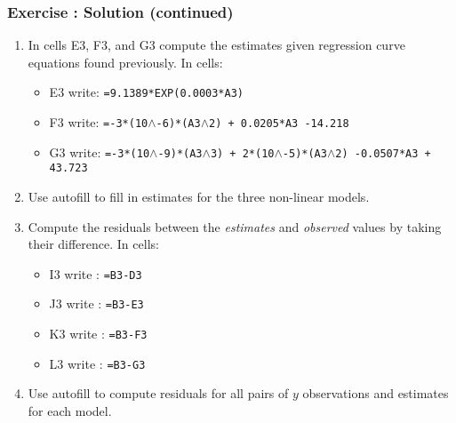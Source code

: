 \documentclass[12pt]{beamer}
\begin{document}
	\begin{frame}
		\frametitle{Exercise : Solution (continued)}
		\begin{enumerate}
			\item In cells E3, F3, and G3 compute the estimates given regression curve equations found previously. In cells:
			\begin{itemize}
				\item E3 write: \texttt{=9.1389*EXP(0.0003*A3)}
				\item F3 write: \texttt{=-3*(10$\wedge$-6)*(A3$\wedge$2) + 0.0205*A3 -14.218}
				\item G3 write: \texttt{=-3*(10$\wedge$-9)*(A3$\wedge$3) + 2*(10$\wedge$-5)*(A3$\wedge$2) -0.0507*A3 + 43.723}
			\end{itemize}
		\item Use autofill to fill in estimates for the three non-linear models. 
		\item Compute the residuals between the \textit{estimates} and \textit{observed} values by taking their difference. In cells:
		\begin{itemize}
			\item I3 write : \texttt{=B3-D3}
			\item J3 write : \texttt{=B3-E3}
			\item K3 write : \texttt{=B3-F3}
			\item L3 write : \texttt{=B3-G3}
		\end{itemize}
		\item Use autofill to compute residuals for all pairs of $y$ observations and estimates for each model.
	\end{enumerate}
	\end{frame}
\end{document}

